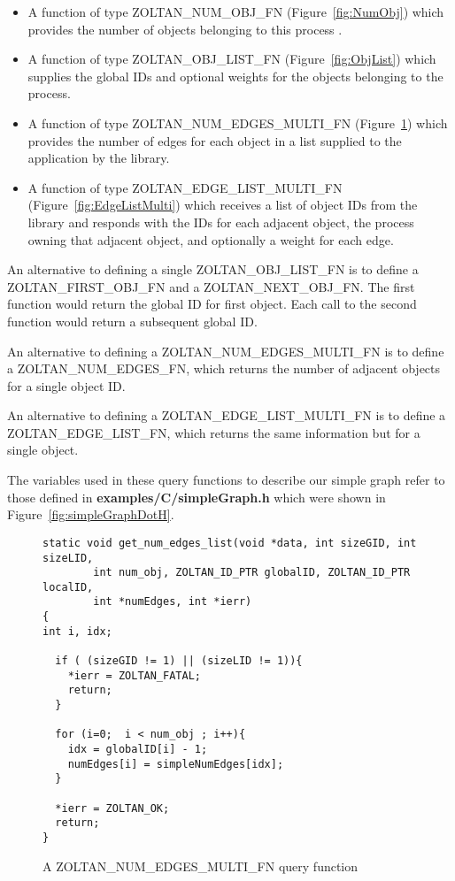 \begin{itemize}
\item A function of type ZOLTAN\_NUM\_OBJ\_FN (Figure~\ref{fig:NumObj}) which provides the number of objects belonging to this process .
\item A function of type ZOLTAN\_OBJ\_LIST\_FN (Figure~\ref{fig:ObjList}) which supplies the global IDs and optional weights 
for the objects belonging to the process.
\item A function of type ZOLTAN\_NUM\_EDGES\_MULTI\_FN (Figure~\ref{fig:NumEdges}) which provides the number of edges for each object in a list supplied to the application by the library.
\item A function of type ZOLTAN\_EDGE\_LIST\_MULTI\_FN (Figure~\ref{fig:EdgeListMulti})
which receives a list of object IDs from the library and responds with the IDs for
each adjacent object, the process owning that adjacent object, and optionally a weight
for each edge.
\end{itemize}

An alternative to defining a single ZOLTAN\_OBJ\_LIST\_FN is to define
a ZOLTAN\_FIRST\_OBJ\_FN and a ZOLTAN\_NEXT\_OBJ\_FN.  The first function
would return the global ID for first object.  Each call to the second function would
return a subsequent global ID.

An alternative to defining a ZOLTAN\_NUM\_EDGES\_MULTI\_FN is to 
define a ZOLTAN\_NUM\_EDGES\_FN, which returns the number of adjacent
objects for a single object ID.

An alternative to defining a ZOLTAN\_EDGE\_LIST\_MULTI\_FN is to 
define a ZOLTAN\_EDGE\_LIST\_FN, which
returns the same information but for a single object.

The variables used in these query functions to describe our simple graph
refer to those defined in \textbf{examples/C/simpleGraph.h} which were shown in
Figure~\ref{fig:simpleGraphDotH}.

\begin{figure}
\begin{flushleft}
\begin{verbatim}
static void get_num_edges_list(void *data, int sizeGID, int sizeLID,
        int num_obj, ZOLTAN_ID_PTR globalID, ZOLTAN_ID_PTR localID,
        int *numEdges, int *ierr)
{
int i, idx;

  if ( (sizeGID != 1) || (sizeLID != 1)){
    *ierr = ZOLTAN_FATAL;
    return;
  }

  for (i=0;  i < num_obj ; i++){
    idx = globalID[i] - 1;
    numEdges[i] = simpleNumEdges[idx];
  }

  *ierr = ZOLTAN_OK;
  return;
}
\end{verbatim}
\end{flushleft}
\caption{A ZOLTAN\_NUM\_EDGES\_MULTI\_FN query function}
\label{fig:NumEdges}
\end{figure}

